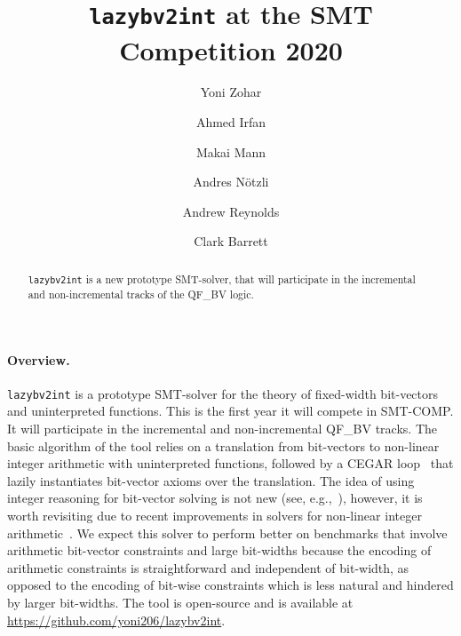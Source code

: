 \documentclass{easychair}
\newcommand{\lazybvtoint}{\texttt{lazybv2int}\xspace}
\newcommand{\smtcomp}{SMT-COMP\xspace}
\newcommand{\qfbv}{QF\_BV\xspace}
\begin{document}
\author{
		Yoni Zohar\and
		Ahmed Irfan \and
		Makai Mann \and
		Andres N\"otzli \and
		Andrew Reynolds\and
		Clark Barrett
}

\title{\lazybvtoint at the SMT Competition 2020}

\titlerunning{}
\authorrunning{}

\maketitle


\noindent
\begin{abstract}
\noindent \lazybvtoint is a new prototype SMT-solver, that will participate in
the incremental and non-incremental tracks of the \qfbv logic.
\end{abstract}

\paragraph{Overview.}
\lazybvtoint is a prototype SMT-solver for the theory of fixed-width bit-vectors
and uninterpreted functions. This is the first year it will compete in \smtcomp.
It will participate in the incremental and non-incremental \qfbv tracks.
%
The basic algorithm of the tool relies on a translation from bit-vectors to
non-linear integer arithmetic with uninterpreted functions, followed by a CEGAR
loop~\cite{cegar} that lazily instantiates bit-vector axioms over the
translation. The idea of using integer reasoning for bit-vector solving is not
new (see,
e.g.,~\cite{DBLP:journals/entcs/BozzanoBCFHKPS06,DBLP:conf/fmcad/BackemanRZ18}),
however, it is worth revisiting due to recent improvements in solvers for
non-linear integer arithmetic~\cite{DBLP:conf/vmcai/Jovanovic17,
  DBLP:conf/frocos/ReynoldsTJB17, DBLP:conf/sat/CimattiGIRS18}.
%
We expect this solver to perform better on benchmarks that involve arithmetic
bit-vector constraints and large bit-widths because the encoding of arithmetic
constraints is straightforward and independent of bit-width, as opposed to the
encoding of bit-wise constraints which is less natural and hindered by larger
bit-widths.
%
The tool is open-source and is available at \url{https://github.com/yoni206/lazybv2int}.
\end{document}
